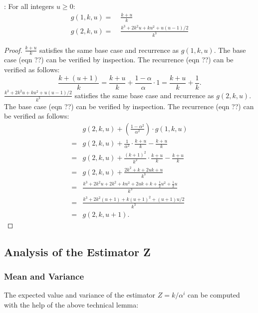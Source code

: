 \documentclass{sig-alternate}
\begin{document}
: For all integers $u \geq 0$: 
\begin{align}
g(1,k,u) = & \;\frac{k+u}{k} \\
g(2,k,u) = & \;\frac{k^3 + 2 k^2 u + ku^2 + u(u\!-\!1)/2}{k^3}
\end{align}
\begin{proof}
$\frac{k+u}{k}$ satisfies the same base case and recurrence as $g(1,k,u)$.
The base case (eqn ??) can be verified by inspection. The recurrence (eqn ??) can be verified as follows:
\begin{equation}
\frac{k+(u+1)}{k} = \frac{k+u}{k} + \frac{1-\alpha}{\alpha} \cdot 1 = \frac{k+u}{k} + \frac{1}{k}.
\end{equation}
$\frac{k^3 + 2 k^2 u + ku^2 + u(u\!-\!1)/2}{k^3}$ satisfies the same base case and recurrence as $g(2,k,u)$.
The base case (eqn ??) can be verified by inspection. The recurrence (eqn ??) can be verified as follows:
\begin{align}
   & g(2,k,u) + \left(\frac{1-\alpha^2}{\alpha^2}\right) \cdot g(1,k,u) \\
 = & g(2,k,u) + \frac{1}{\alpha^2} \cdot \frac{k+u}{k} - \frac{k+u}{k} \\
 = & g(2,k,u) + \frac{(k+1)^2}{k^2} \cdot \frac{k+u}{k} - \frac{k+u}{k} \\
 = & g(2,k,u) + \frac{2k^2+k+2uk+u}{k^3} \\
 = & \frac{k^3 + 2k^2u +2k^2 + ku^2 + 2uk + k + \frac{1}{2} u^2 + \frac{1}{2} u}{k^3} \\
 = & \frac{k^3 + 2k^2(u+1) + k(u+1)^2 + (u+1)u/2}{k^3} \\
 = & g(2,k,u+1).
\end{align}
\end{proof}



\subsection{Analysis of the Estimator Z}

\subsubsection{Mean and Variance}

The expected value and variance of the estimator $Z = k / \alpha^i$ can be computed
with the help of the above technical lemma:
\end{document}
